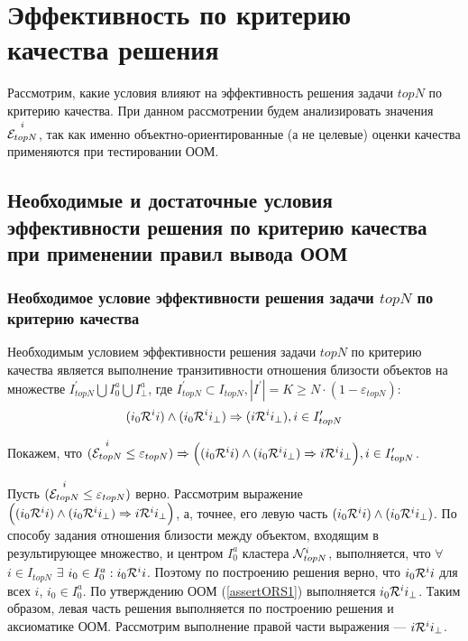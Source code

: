

\section{Эффективность по критерию качества решения}
Рассмотрим, какие условия влияют на эффективность решения задачи $topN$
по критерию качества. При данном рассмотрении будем анализировать значения
${\overset{i}{\mathcal{E}_{topN}}}$, так как именно
объектно-ориентированные (а не целевые) оценки качества применяются при
тестировании ООМ.
\subsection{Необходимые и достаточные условия эффективности решения
по критерию качества при применении правил вывода ООМ}
\subsubsection{Необходимое условие эффективности решения задачи $topN$ по
критерию качества}
\begin{trm}\label{transAssert1}
Необходимым условием эффективности решения задачи $topN$ по критерию качества
является выполнение
транзитивности отношения близости объектов на множестве
	$I^{\prime}_{topN} \bigcup I^a_0 \bigcup I^a_{\bot}$, где
	$I^{\prime}_{topN} \subset I_{topN}, |I^{\prime}| = K \ge N \cdot (1 -
	\varepsilon_{topN})$:
\begin{equation}
	(i_0 \mathcal{R}^i i) \wedge (i_0 \mathcal{R}^i i_{\bot})
	\Rightarrow (i \mathcal{R}^i i_{\bot}),
	i \in I^{\prime}_{topN}
\end{equation}
\end{trm}
Покажем, что $({\overset{i}{\mathcal{E}_{topN}}} \le \varepsilon_{topN}) \Rightarrow
\Big((i_0 \mathcal{R}^i i) \wedge (i_0 \mathcal{R}^i i_{\bot}) \Rightarrow i \mathcal{R}^i i_{\bot}\Big),
i \in I^{\prime}_{topN}$.

Пусть $({\overset{i}{\mathcal{E}_{topN}}} \le \varepsilon_{topN})$ верно. Рассмотрим выражение
$\Big((i_0 \mathcal{R}^i i) \wedge (i_0 \mathcal{R}^i i_{\bot}) \Rightarrow i \mathcal{R}^i i_{\bot}\Big)$,
а, точнее, его левую часть
$(i_0 \mathcal{R}^i i) \wedge (i_0 \mathcal{R}^i i_{\bot})$.
По способу задания отношения близости между объектом, входящим в результирующее
множество, и центром $I^a_0$ кластера ${\mathcal{N}^i_{topN}}$, выполняется, что
$\forall$ $i \in I_{topN}$ $\exists$ $i_0
\in I^a_0: i_0 \mathcal{R}^i i$. Поэтому по построению решения верно,
что $i_0 \mathcal{R}^i i$ для всех $i$, $i_0 \in I^a_0$.
По утверждению ООМ (\ref{assertORS1}) выполняется $i_0 \mathcal{R}^i i_{\bot}$.
Таким образом, левая часть решения выполняется по построению решения и
аксиоматике ООМ. Рассмотрим выполнение правой части выражения --- $i \mathcal{R}^i
i_{\bot}$.

